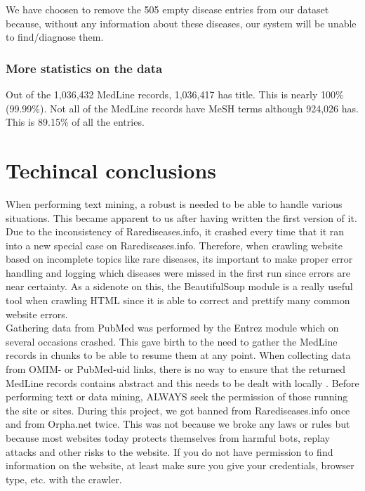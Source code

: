 We have choosen to remove the 505 empty disease entries from our
dataset because, without any information about these diseases, our
system will be unable to find/diagnose them.

\subsubsection{More statistics on the data}
Out of the 1,036,432 MedLine records, 1,036,417 has title. This is
nearly 100\% (99.99\%). Not all of the MedLine records have MeSH terms
although 924,026 has. This is 89.15\% of all the entries. 

\section{Techincal conclusions}

When performing text mining, a robust is needed to be able to handle
various situations. This became apparent to us after having written
the first version of it. Due to the inconsistency of
Rarediseases.info, it crashed every time that it ran into a new
special case on Rarediseases.info. Therefore, when crawling website
based on incomplete topics like rare diseases, its important to make
proper error handling and logging which diseases were missed in the
first run since errors are near certainty. As a sidenote on this, the
BeautifulSoup module is a really useful tool when crawling HTML since
it is able to correct and prettify many common website errors.\\

Gathering data from PubMed was performed by the Entrez module which on
several occasions crashed. This gave birth to the need to gather the
MedLine records in chunks to be able to resume them at any point. When
collecting data from OMIM- or PubMed-uid links, there is no way to
ensure that the returned MedLine records contains abstract and this
needs to be dealt with locally . Before
performing text or data mining, ALWAYS seek the permission of those
running the site or sites. During this project, we got banned from
Rarediseases.info once and from Orpha.net twice. This was not because
we broke any laws or rules but because most websites today protects
themselves from harmful bots, replay attacks and other risks to the
website. If you do not have permission to find information on the
website, at least make sure you give your credentials, browser type,
etc. with the crawler.\\

